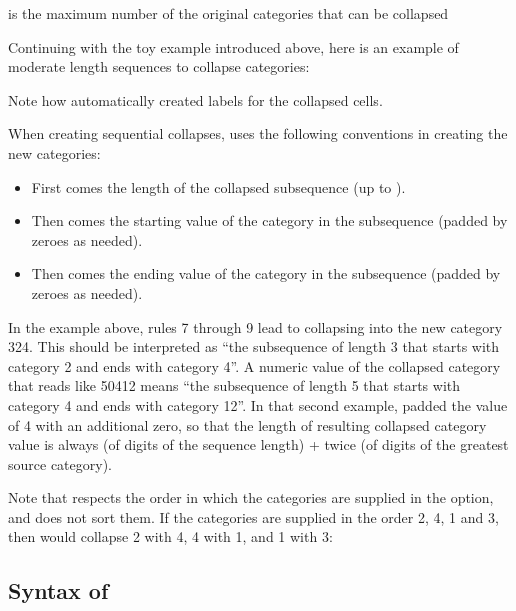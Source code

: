 \hangpara
{} is the maximum number of the original categories that can be collapsed

Continuing with the toy example introduced above, here is an example of moderate length sequences to collapse categories:

\begin{stlog}
\nullskip
\end{stlog}

Note how  automatically created labels for the collapsed cells.

When creating sequential collapses,  uses the following conventions
in creating the new categories:
\begin{itemize}
    \item First comes the length of the collapsed subsequence (up to ).
    \item Then comes the starting value of the category in the subsequence (padded by zeroes as needed).
    \item Then comes the ending value of the category in the subsequence (padded by zeroes as needed).
\end{itemize}

In the example above, rules 7 through 9 lead to collapsing into the new category 324. This
should be interpreted as ``the subsequence of length 3 that starts with category 2 and ends with category 4''.
A numeric value of the collapsed category that reads like 50412 means
``the subsequence of length 5 that starts with category 4 and ends with category 12''.
In that second example,  padded the value of 4 with an additional zero,
so that the length of resulting collapsed category value is always (\stnum of digits of the sequence length) +
twice (\stnum of digits of the greatest source category).

Note that  respects the order in which the categories are
supplied in the  option, and does not sort them. If the categories are supplied
in the order 2, 4, 1 and 3, then  would collapse 2 with 4, 4 with 1,
and 1 with 3:

\bigskip

\begin{stlog}
\nullskip
\end{stlog}


\subsection{Syntax of }

